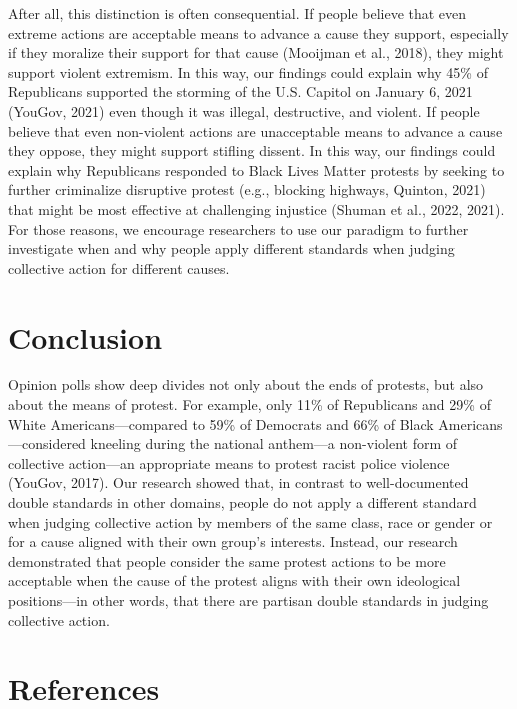 \documentclass[twocolumn, 11pt, letterpaper]{article}
\newcommand{\refsection}{\section{References}}
\begin{document}
After all, this distinction is often consequential. If people believe
that even extreme actions are acceptable means to advance a cause they
support, especially if they moralize their support for that cause
(Mooijman et al., 2018), they might support violent extremism. In this
way, our findings could explain why 45\% of Republicans supported the
storming of the U.S. Capitol on January 6, 2021 (YouGov, 2021) even
though it was illegal, destructive, and violent. If people believe that
even non-violent actions are unacceptable means to advance a cause they
oppose, they might support stifling dissent. In this way, our findings
could explain why Republicans responded to Black Lives Matter protests
by seeking to further criminalize disruptive protest (e.g., blocking
highways, Quinton, 2021) that might be most effective at challenging
injustice (Shuman et al., 2022, 2021). For those reasons, we encourage
researchers to use our paradigm to further investigate when and why
people apply different standards when judging collective action for
different causes.

\hypertarget{conclusion}{%
\section{Conclusion}\label{conclusion}}

Opinion polls show deep divides not only about the ends of protests, but
also about the means of protest. For example, only 11\% of Republicans
and 29\% of White Americans---compared to 59\% of Democrats and 66\% of
Black Americans---considered kneeling during the national anthem---a
non-violent form of collective action---an appropriate means to protest
racist police violence (YouGov, 2017). Our research showed that, in
contrast to well-documented double standards in other domains, people do
not apply a different standard when judging collective action by members
of the same class, race or gender or for a cause aligned with their own
group's interests. Instead, our research demonstrated that people
consider the same protest actions to be more acceptable when the cause
of the protest aligns with their own ideological positions---in other
words, that there are partisan double standards in judging collective
action.

\refsection

\begingroup

\noindent \setlength{\parindent}{-0.5in} \setlength{\leftskip}{0.5in}
\small
\end{document}

